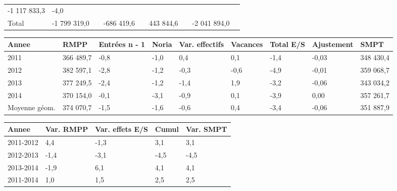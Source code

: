 \begin{longtable}[]{@{}lllllllll@{}}
\begin{minipage}[t]{0.10\columnwidth}
-1 117 833,3\strut
\end{minipage} & \begin{minipage}[t]{0.06\columnwidth}\raggedright
-4,0\strut
\end{minipage}\tabularnewline
\begin{minipage}[t]{0.05\columnwidth}\raggedright
Total\strut
\end{minipage} & \begin{minipage}[t]{0.10\columnwidth}\raggedright
-1 799 319,0\strut
\end{minipage} & \begin{minipage}[t]{0.06\columnwidth}\raggedright
\strut
\end{minipage} & \begin{minipage}[t]{0.16\columnwidth}\raggedright
-686 419,6\strut
\end{minipage} & \begin{minipage}[t]{0.06\columnwidth}\raggedright
\strut
\end{minipage} & \begin{minipage}[t]{0.12\columnwidth}\raggedright
443 844,6\strut
\end{minipage} & \begin{minipage}[t]{0.06\columnwidth}\raggedright
\strut
\end{minipage} & \begin{minipage}[t]{0.10\columnwidth}\raggedright
-2 041 894,0\strut
\end{minipage} & \begin{minipage}[t]{0.06\columnwidth}\raggedright
\strut
\end{minipage}\tabularnewline
\bottomrule
\end{longtable}

\begin{longtable}[]{@{}lllllllll@{}}
\toprule
Annee & RMPP & Entrées n - 1 & Noria & Var. effectifs & Vacances & Total
E/S & Ajustement & SMPT\tabularnewline
\midrule
\endhead
2011 & 366 489,7 & -0,8 & -1,0 & 0,4 & 0,1 & -1,4 & -0,03 & 348
430,4\tabularnewline
2012 & 382 597,1 & -2,8 & -1,2 & -0,3 & -0,6 & -4,9 & -0,01 & 359
068,7\tabularnewline
2013 & 377 249,5 & -2,4 & -1,2 & -1,4 & 1,9 & -3,2 & -0,06 & 343
034,2\tabularnewline
2014 & 370 154,0 & -0,1 & -3,1 & -0,9 & 0,1 & -3,9 & 0,00 & 357
261,7\tabularnewline
Moyenne géom. & 374 070,7 & -1,5 & -1,6 & -0,6 & 0,4 & -3,4 & -0,06 &
351 887,9\tabularnewline
\bottomrule
\end{longtable}

\begin{longtable}[]{@{}lllll@{}}
\toprule
Annee & Var. RMPP & Var. effets E/S & Cumul & Var. SMPT\tabularnewline
\midrule
\endhead
2011-2012 & 4,4 & -1,3 & 3,1 & 3,1\tabularnewline
2012-2013 & -1,4 & -3,1 & -4,5 & -4,5\tabularnewline
2013-2014 & -1,9 & 6,1 & 4,1 & 4,1\tabularnewline
2011-2014 & 1,0 & 1,5 & 2,5 & 2,5\tabularnewline
\bottomrule
\end{longtable}

